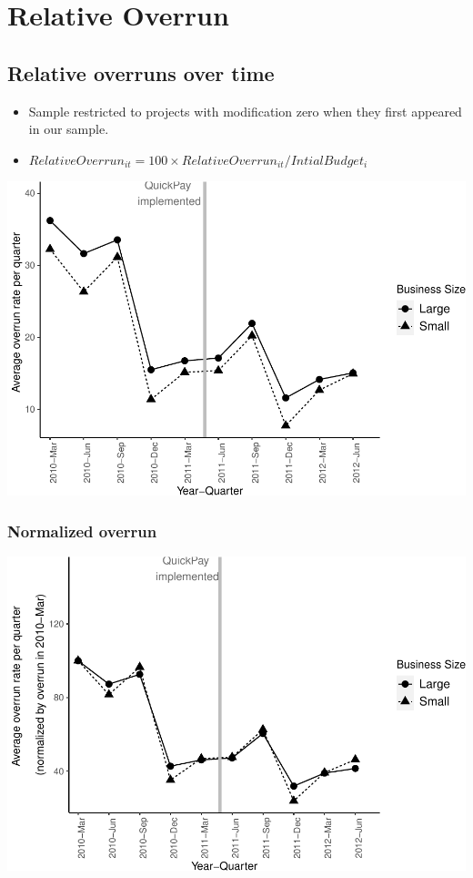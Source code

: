 \documentclass[
]{article}
\begin{document}
\hypertarget{relative-overrun}{%
\section{Relative Overrun}\label{relative-overrun}}

\hypertarget{relative-overruns-over-time}{%
\subsection{Relative overruns over
time}\label{relative-overruns-over-time}}

\begin{itemize}
\item
  Sample restricted to projects with modification zero when they first
  appeared in our sample.
\item
  \(RelativeOverrun_{it} = 100 \times RelativeOverrun_{it}/IntialBudget_i\)
\end{itemize}

\includegraphics{qp_first_budget_overrun_files/figure-latex/plot_relative_overrun-1.pdf}

\hypertarget{normalized-overrun-2}{%
\subsubsection{Normalized overrun}\label{normalized-overrun-2}}

\includegraphics{qp_first_budget_overrun_files/figure-latex/normalized_relative_plot-1.pdf}
\end{document}
